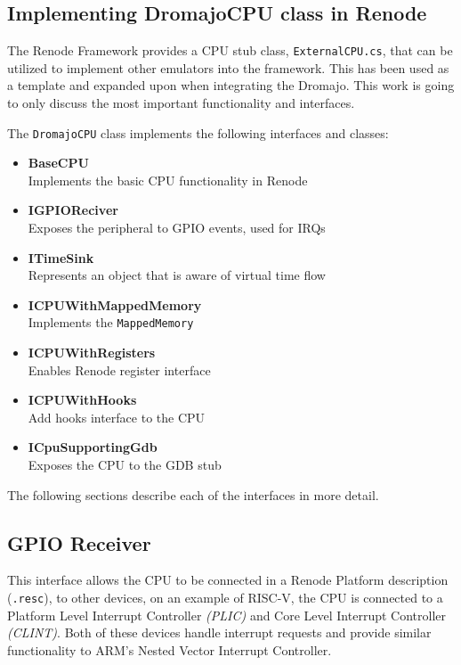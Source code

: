 \pagebreak

\subsection{Implementing DromajoCPU class in Renode}

The Renode Framework provides a CPU stub class, \texttt{ExternalCPU.cs}, that can be utilized to implement other
emulators into the framework. This has been used as a template and expanded upon when integrating the Dromajo.
This work is going to only discuss the most important functionality and interfaces.

\vspace{10px}
\noindent
The \texttt{DromajoCPU} class implements the following interfaces and classes:
\begin{multicols}{2}
    \begin{itemize}
        \item{\textbf{BaseCPU}\\Implements the basic CPU functionality in Renode}
        \item{\textbf{IGPIOReciver}\\Exposes the peripheral to GPIO events, used for IRQs}
        \item{\textbf{ITimeSink}\\Represents an object that is aware of virtual time flow}
        \item{\textbf{ICPUWithMappedMemory}\\Implements the \texttt{MappedMemory}}
        \item{\textbf{ICPUWithRegisters}\\Enables Renode register interface}
        \item{\textbf{ICPUWithHooks}\\Add hooks interface to the CPU}
        \item{\textbf{ICpuSupportingGdb}\\Exposes the CPU to the GDB stub}
    \end{itemize}
\end{multicols}

\noindent
The following sections describe each of the interfaces in more detail.

\subsection*{GPIO Receiver}
This interface allows the CPU to be connected in a Renode Platform description (\texttt{.resc}), to other devices,
on an example of RISC-V, the CPU is connected to a Platform Level Interrupt Controller \textit{(PLIC)} and
Core Level Interrupt Controller \textit{(CLINT)}. Both of these devices handle interrupt requests and provide similar
functionality to ARM's Nested Vector Interrupt Controller.

